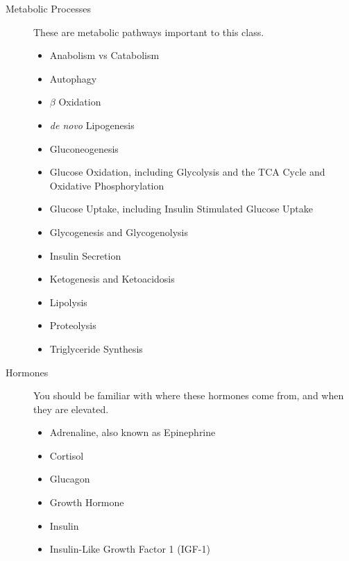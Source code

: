 \documentclass{tufte-handout}
\begin{document}
\begin{description}
	\item [Metabolic Processes]  These are metabolic pathways important to this class.
	\begin{itemize}
		\item Anabolism vs Catabolism
		\item Autophagy
		\item $\beta$ Oxidation
		\item \textit{de novo} Lipogenesis
		\item Gluconeogenesis
		\item Glucose Oxidation, including Glycolysis and the TCA Cycle and Oxidative Phosphorylation
		\item Glucose Uptake, including Insulin Stimulated Glucose Uptake
		\item Glycogenesis and Glycogenolysis
		\item Insulin Secretion
		\item Ketogenesis and Ketoacidosis
		\item Lipolysis
		\item Proteolysis
		\item Triglyceride Synthesis
\end{itemize}

	\item[Hormones] You should be familiar with where these hormones come from, and when they are elevated.
	\begin{itemize}
		\item Adrenaline, also known as Epinephrine
		\item Cortisol
		\item Glucagon
		\item Growth Hormone
		\item Insulin
		\item Insulin-Like Growth Factor 1 (IGF-1)
	\end{itemize}


\end{description}
\end{document}

